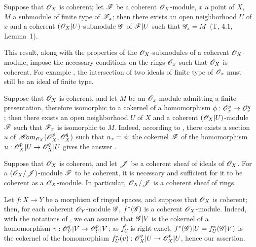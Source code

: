 \begin{env}[5.3.8]
\label{0.5.3.8}
Suppose that $\mathscr{O}_X$ is coherent;
let $\mathscr{F}$ be a coherent $\mathscr{O}_X$-module, $x$ a point of $X$, $M$ a submodule of finite type of $\mathscr{F}_x$;
then there exists an open neighborhood $U$ of $x$ and a coherent $(\mathscr{O}_X|U)$-submodule $\mathscr{G}$ of $\mathscr{F}|U$ such that $\mathscr{G}_x=M$ (T, 4.1, Lemma~1).

This result, along with the properties of the $\mathscr{O}_X$-submodules of a coherent $\mathscr{O}_X$-module, impose the necessary conditions on the rings $\mathscr{O}_x$ such that $\mathscr{O}_X$ is coherent.
For example , the intersection of two ideals of finite type of $\mathscr{O}_x$ must still be an ideal of finite type.
\end{env}

\begin{env}[5.3.9]
\label{0.5.3.9}
Suppose that $\mathscr{O}_X$ is coherent, and let $M$ be an $\mathscr{O}_x$-module admitting a finite presentation, therefore isomorphic to a cokernel of a homomorphism $\vphi:\OO_x^p\to\OO_x^q$;
then there exists an open neighborhood $U$ of $X$ and a coherent $(\mathscr{O}_X|U)$-module $\mathscr{F}$ such that $\mathscr{F}_x$ is isomorphic to $M$.
Indeed, according to , there exists a section $u$ of $\mathscr{H}\!{om}_{\mathscr{O}_X}(\mathscr{O}_X^p,\mathscr{O}_X^q)$ such that $u_x=\phi$;
the cokernel $\mathscr{F}$ of the homomorphism $u:\OO_X^p|U\to\OO_X^q|U$ gives the answer .
\end{env}

\begin{env}[5.3.10]
\label{0.5.3.10}
Suppose that $\mathscr{O}_X$ is coherent, and let $\mathscr{J}$ be a coherent sheaf of ideals of $\mathscr{O}_X$.
For a $(\mathscr{O}_X/\mathscr{J})$-module $\mathscr{F}$ to be coherent, it is necessary and sufficient for it to be coherent as a $\mathscr{O}_X$-module.
In particular, $\mathscr{O}_X/\mathscr{J}$ is a coherent sheaf of rings.
\end{env}

\begin{env}[5.3.11]
\label{0.5.3.11}
Let $f:X\to Y$ be a morphism of ringed spaces, and suppose that $\mathscr{O}_X$ is coherent;
then, for each coherent $\mathscr{O}_Y$-module $\mathscr{G}$, $f^*(\mathscr{G})$ is a coherent $\mathscr{O}_X$-module.
Indeed, with the notations of , we can assume that $\mathscr{G}|V$ is the cokernel of a homomorphism $v:\OO_Y^q|V\to\OO_Y^p|V$;
as $f_U^*$ is right exact, $f^*(\mathscr{G})|U=f_U^*(\mathscr{G}|V)$ is the cokernel of the homomorphism $f_U^*(v):\OO_X^q|U\to\OO_X^p|U$, hence our assertion.
\end{env}

